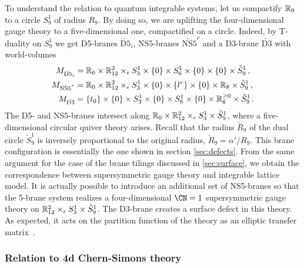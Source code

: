 To understand the relation to quantum integrable systems, let us
compactify $\mathbb{R}_9$ to a circle $S^1_9$ of radius $R_9$.  By doing so,
we are uplifting the four-dimensional gauge theory to a
five-dimensional one, compactified on a circle.  Indeed, by T-duality
on $S^1_9$ we get D5-branes $\check{\mathrm{D5}}_i$, NS5-branes
$\check{\mathrm{NS5}}^r$ and a D3-brane $\check{\mathrm{D3}}$ with
world-volumes
\begin{align}
  \label{eq:M-D5}
  M_{\check{\mathrm{D5}}_i}
  &=
  \mathbb{R}_0 \times \mathbb{R}^2_{12} \times_\epsilon S^1_3 \times \{0\}
  \times S^1_6 \times \{0\} \times \{0\} \times \check S^1_9 \,,
  \\
  \label{eq:M-NS5}
  M_{\check{\mathrm{NS5}}^r}
  &=
  \mathbb{R}_0 \times \mathbb{R}^2_{12} \times_\epsilon S^1_3 \times \{0\}
  \times \{l^r\} \times \{0\} \times \mathbb{R}_8 \times \check S^1_9 \,,
  \\
  \label{eq:M-D3}
  M_{\check{\mathrm{D3}}}
  &=
  \{t_0\} \times \{0\} \times S^1_3 \times \{0\}
  \times S^1_6 \times \{0\} \times \mathbb{R}^{\geq0}_8
  \times \check S^1_9 \,.
\end{align}
The D5- and NS5-branes intersect along
$\mathbb{R}_0 \times \mathbb{R}^2_{12} \times_\epsilon S^1_3 \times \check S^1_9$, where a
five-dimensional circular quiver theory arises.  Recall that the
radius $\check{R}_9$ of the dual circle $\check{S}^1_9$ is inversely
proportional to the original radius, $\check{R}_9 = \alpha'/R_9$.
This brane configuration is essentially the one shown in section \ref{sec:defects}.
From the same argument for the case of the brane tilings discussed in \ref{sec:surface},
we obtain the correspondence between supersymmetric gauge theory
and integrable lattice model.
It is actually possible to
introduce an additional set of NS5-branes so that the 5-brane system
realizes a four-dimensional $\CN = 1$ supersymmetric gauge theory on
$\mathbb{R}^2_{12} \times_\epsilon S^1_3 \times \check S^1_9$.  The D3-brane
creates a surface defect in this theory.  As expected, it acts on the
partition function of the theory as an elliptic transfer
matrix~\cite{Maruyoshi:2016caf,Yagi:2017hmj}.








\subsubsection{Relation to 4d Chern-Simons theory}


